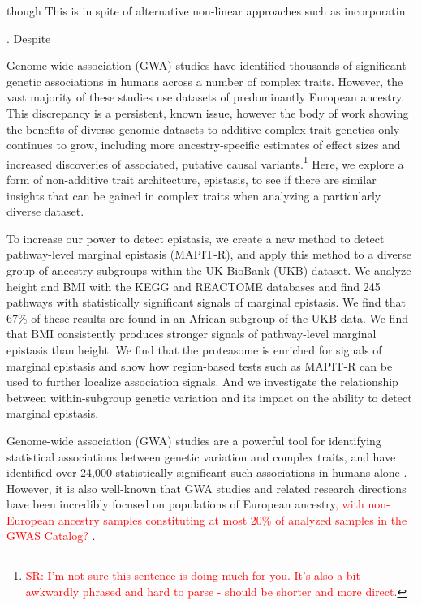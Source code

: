 \documentclass[12pt,a4paper]{article}
\newcommand{\red}[1]{\textcolor{red}{#1}}
\begin{document}
though  
This is in spite of alternative non-linear approaches such as incorporatin

. Despite 




Genome-wide association (GWA) studies have identified thousands of significant genetic associations in humans across a number of complex traits. However, the vast majority of these studies use datasets of predominantly European ancestry. This discrepancy is a persistent, known issue, however the body of work showing the benefits of diverse genomic datasets to additive complex trait genetics only continues to grow, including more ancestry-specific estimates of effect sizes and increased discoveries of associated, putative causal variants.\footnote{\red{SR: I'm not sure this sentence is doing much for you. It's also a bit awkwardly phrased and hard to parse - should be shorter and more direct.}} Here, we explore a form of non-additive trait architecture, epistasis, to see if there are similar insights that can be gained in complex traits when analyzing a particularly diverse dataset. 

To increase our power to detect epistasis, we create a new method to detect pathway-level marginal epistasis (MAPIT-R), and apply this method to a diverse group of ancestry subgroups within the UK BioBank (UKB) dataset. We analyze height and BMI with the KEGG and REACTOME databases and find 245 pathways with statistically significant signals of marginal epistasis. We find that 67\% of these results are found in an African subgroup of the UKB data. We find that BMI consistently produces stronger signals of pathway-level marginal epistasis than height. We find that the proteasome is enriched for signals of marginal epistasis and show how region-based tests such as MAPIT-R can be used to further localize association signals. And we investigate the relationship between within-subgroup genetic variation and its impact on the ability to detect marginal epistasis. 














Genome-wide association (GWA) studies are a powerful tool for identifying statistical associations between genetic variation and complex traits, and have identified over 24,000 statistically significant such associations in humans alone \citep{Buniello2019}. However, it is also well-known that GWA studies and related research directions have been incredibly focused on populations of European ancestry\red{, with non-European ancestry samples constituting at most 20\% of analyzed samples in the GWAS Catalog?} \citep{Need2009,Popejoy2016,Gurdasani2019,Martin2019,Sirugo2019}.
\end{document}
